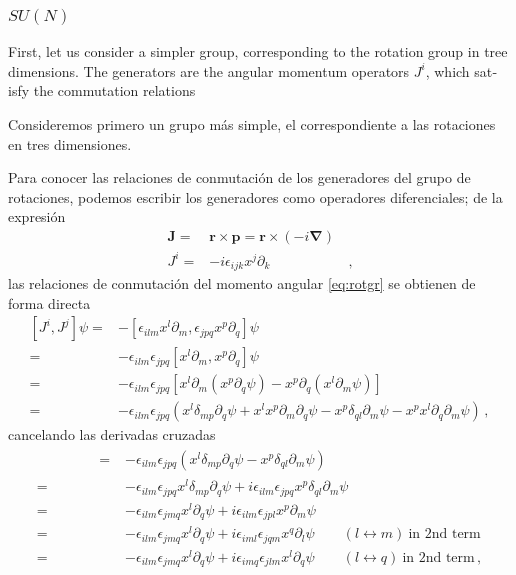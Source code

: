 \subsubsection{$SU(N)$}
\begin{english}
First, let us consider a simpler group, corresponding to the rotation group in tree dimensions. The generators are the angular momentum operators $J^i$, which satisfy the commutation relations
\end{english}
\begin{spanish}
Consideremos primero un grupo más simple, el correspondiente a las rotaciones en tres dimensiones. 
\end{spanish}
Para conocer las relaciones de conmutación de los generadores del grupo de rotaciones, podemos escribir los generadores como operadores diferenciales; de la expresión 
\begin{align}
  \mathbf{J}=&\mathbf{r}\times \mathbf{p}=\mathbf{r}\times (-i\boldsymbol{\nabla})\nonumber\\
J^{i}=&-i\epsilon_{ijk}x^{j}\partial_k&\,,
\end{align}
las relaciones de conmutación del momento angular \eqref{eq:rotgr} se obtienen de forma directa
\begin{align*}
  \left[ J^i,J^j \right]\psi=&-\left[ \epsilon_{ilm}x^{l}\partial_m ,\epsilon_{jpq}x^{p}\partial_q \right]\psi \nonumber\\
=&-\epsilon_{ilm}\epsilon_{jpq}\left[ x^{l}\partial_m ,x^{p}\partial_q \right]\psi \nonumber\\
=&-\epsilon_{ilm}\epsilon_{jpq}\left[ x^{l}\partial_m \left(x^{p}\partial_q\psi  \right)-x^{p}\partial_q \left( x^{l}\partial_m\psi \right) \right] \nonumber\\
   =&-\epsilon_{ilm}\epsilon_{jpq}\left( x^{l}\delta_{mp}\partial_q\psi +x^{l}x^{p}\partial_m \partial_q\psi  -x^{p}\delta_{ql}\partial_m\psi-x^{p}  x^{l}\partial_q\partial_m\psi \right)\,,
\end{align*}
cancelando las derivadas cruzadas
\begin{align*}
\phantom{\left[ J^i,J^j \right]\psi}   =&-\epsilon_{ilm}\epsilon_{jpq}\left( x^{l}\delta_{mp}\partial_q\psi   -x^{p}\delta_{ql}\partial_m\psi \right) \nonumber\\
   =&-\epsilon_{ilm}\epsilon_{jpq} x^{l}\delta_{mp}\partial_q\psi +i\epsilon_{ilm}\epsilon_{jpq}x^{p}\delta_{ql}\partial_m\psi \nonumber\\
   =&-\epsilon_{ilm}\epsilon_{jmq} x^{l}\partial_q\psi +i\epsilon_{ilm}\epsilon_{jpl}x^{p}\partial_m\psi \nonumber\\
   =&-\epsilon_{ilm}\epsilon_{jmq} x^{l}\partial_q\psi +i\epsilon_{iml}\epsilon_{jqm}x^{q}\partial_l\psi \qquad (l\leftrightarrow m)\ \text{in 2nd term}\nonumber\\
   =&-\epsilon_{ilm}\epsilon_{jmq} x^{l}\partial_q\psi +i\epsilon_{imq}\epsilon_{jlm}x^{l}\partial_q\psi  \qquad (l\leftrightarrow q)\ \text{in 2nd term}\,,
\end{align*}
